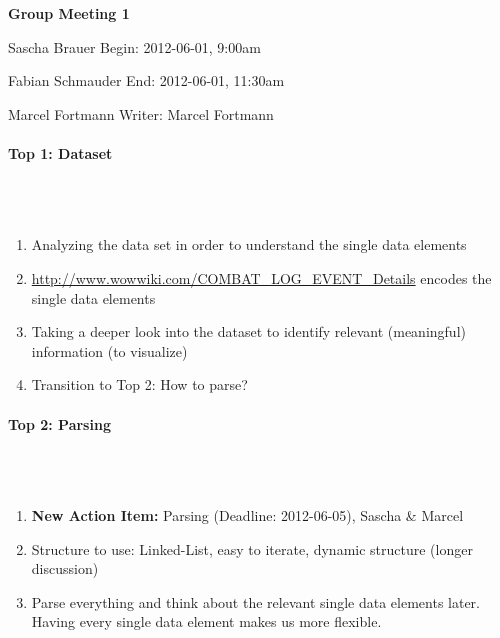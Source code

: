 \documentclass{scrartcl}
\begin{document}
\clearpage

\begin{center}
{\huge \textbf{Group Meeting 1}}\\
\end{center}
\begin{description}
\item Sascha Brauer \hfill Begin: 2012-06-01, 9:00am 
\item Fabian Schmauder \hfill End: 2012-06-01, 11:30am
\item Marcel Fortmann \hfill Writer: Marcel Fortmann
\end{description}

\paragraph{Top 1: Dataset}
\hfill \\ \hfill \\
\begin {enumerate}
\item Analyzing the data set in order to understand the single data elements
\item \url{http://www.wowwiki.com/COMBAT_LOG_EVENT_Details} encodes the single data elements
\item Taking a deeper look into the dataset to identify relevant (meaningful) information (to visualize)
\item Transition to Top 2: How to parse?
\end {enumerate}

\paragraph{Top 2: Parsing}
\hfill \\ \hfill \\
\begin {enumerate}
\item \textbf{New Action Item:} Parsing (Deadline: 2012-06-05), Sascha \& Marcel
\item Structure to use: Linked-List, easy to iterate, dynamic structure (longer discussion)
\item Parse everything and think about the relevant single data elements later. Having every single data element makes us more flexible.
\end {enumerate}
\end{document}
